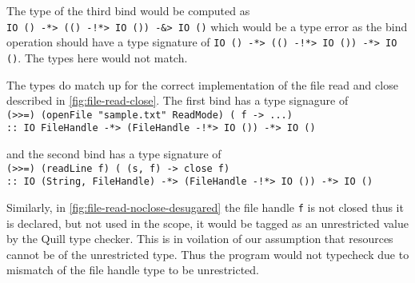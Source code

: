 The type of the third bind would be computed as \\
\texttt{IO () -*> (() -!*> IO ()) -&> IO ()} which would be a type error
as the bind operation should have a type signature of
\texttt{IO () -*> (() -!*> IO ()) -*> IO ()}. The types here would not match.

The types do match up for the correct implementation of the file read and close described in \cref{fig:file-read-close}.
The first bind has a type signagure of\\
\texttt{(>>=) (openFile "sample.txt" ReadMode) (\ f -> ...)}\\
\texttt{:: IO FileHandle -*> (FileHandle -!*> IO ()) -*> IO ()}

and the second bind has a type signature of\\
\texttt{(>>=) (readLine f) (\ (s, f) -> close f)}\\
\texttt{:: IO (String, FileHandle) -*> (FileHandle -!*> IO ()) -*> IO ()}

Similarly, in \cref{fig:file-read-noclose-desugared} the file handle \texttt{f} is not closed thus it is declared, but not used
in the scope, it would be tagged as an unrestricted value by the Quill type checker.
This is in voilation of our assumption that resources cannot be of the unrestricted type. Thus
the program would not typecheck due to mismatch of the file handle type to be unrestricted.

